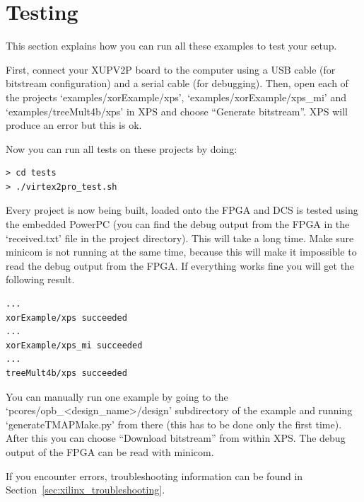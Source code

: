 \documentclass[a4paper,oneside]{memoir}
\begin{document}
\section{Testing}\label{sec:xilinx_testing}
This section explains how you can run  all these examples to test your setup.

First, connect your XUPV2P board to the computer using a USB cable (for bitstream configuration) and a serial cable (for debugging).
Then, open each of the projects `examples/xorExample/xps',  `examples/xorExample/xps\_mi' and `examples/treeMult4b/xps' in XPS and choose ``Generate bitstream''. XPS will produce an error but this is ok.

Now you can run all tests on these projects by doing:
\begin{lstlisting}
> cd tests
> ./virtex2pro_test.sh
\end{lstlisting}

Every project is now being built, loaded onto the FPGA and DCS is tested using the embedded PowerPC (you can find the debug output from the FPGA in the `received.txt' file in the project directory). This will take a long time. Make sure minicom is not running at the same time, because this will make it impossible to read the debug output from the FPGA. If everything works fine you will get the following result. 

\begin{lstlisting}
...
xorExample/xps succeeded
...
xorExample/xps_mi succeeded
...
treeMult4b/xps succeeded
\end{lstlisting}

You can manually run one example by going to the `pcores/opb\_<design\_name>/design' subdirectory of the example and running `generateTMAPMake.py' from there (this has to be done only the first time). After this you can choose ``Download bitstream'' from within XPS.
The debug output of the FPGA can be read with minicom.

If you encounter errors, troubleshooting information can be found in Section~\ref{sec:xilinx_troubleshooting}.
\end{document}
